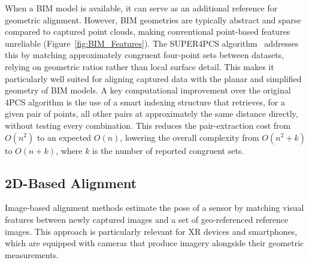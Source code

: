 When a \gls{BIM} model is available, it can serve as an additional reference for geometric alignment. However, BIM geometries are typically abstract and sparse compared to captured point clouds, making conventional point-based features unreliable (Figure~\ref{fig:BIM_Features}). The \gls{SUPER4PCS} algorithm~\cite{mellado_super_2014} addresses this by matching approximately congruent four-point sets between datasets, relying on geometric ratios rather than local surface detail. This makes it particularly well suited for aligning captured data with the planar and simplified geometry of BIM models. A key computational improvement over the original 4PCS algorithm is the use of a smart indexing structure that retrieves, for a given pair of points, all other pairs at approximately the same distance directly, without testing every combination. This reduces the pair-extraction cost from $O(n^2)$ to an expected $O(n)$, lowering the overall complexity from $O(n^2+k)$ to $O(n+k)$, where $k$ is the number of reported congruent sets.

\subsection{2D-Based Alignment}
\label{sec:4_related_2d}

Image-based alignment methods estimate the pose of a sensor by matching visual features between newly captured images and a set of geo-referenced reference images. This approach is particularly relevant for \gls{XR} devices and smartphones, which are equipped with cameras that produce imagery alongside their geometric measurements.

